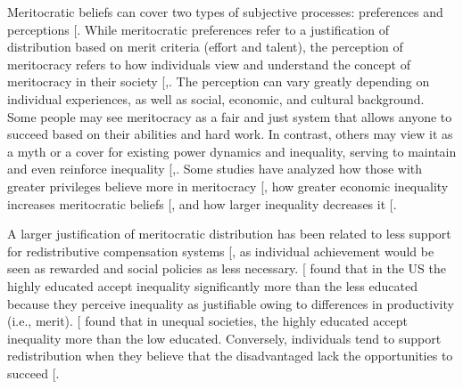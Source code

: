 \documentclass[
  12pt,
  letterpaper,
]{article}
\begin{document}
Meritocratic beliefs can cover two types of subjective processes:
preferences and perceptions
{[}\citeproc{ref-castillo_multidimensional_2023}{49}{]}. While
meritocratic preferences refer to a justification of distribution based
on merit criteria (effort and talent), the perception of meritocracy
refers to how individuals view and understand the concept of meritocracy
in their society
{[},\citeproc{ref-duru-bellat_who_2012}{52}{]}.
The perception can vary greatly depending on individual experiences, as
well as social, economic, and cultural background. Some people may see
meritocracy as a fair and just system that allows anyone to succeed
based on their abilities and hard work. In contrast, others may view it
as a myth or a cover for existing power dynamics and inequality, serving
to maintain and even reinforce inequality
{[},\citeproc{ref-lampert_meritocratic_2013}{53}{]}.
Some studies have analyzed how those with greater privileges believe
more in meritocracy {[}\citeproc{ref-reynolds_perceptions_2014}{13}{]},
how greater economic inequality increases meritocratic beliefs
{[}\citeproc{ref-mijs_paradox_2019}{51}{]}, and how larger inequality
decreases it {[}\citeproc{ref-morris_representing_2022}{54}{]}.

A larger justification of meritocratic distribution has been related to
less support for redistributive compensation systems
{[}\citeproc{ref-frank_performance_2015}{55}{]}, as individual
achievement would be seen as rewarded and social policies as less
necessary. {[}\citeproc{ref-almas_cutthroat_2020}{56}{]} found that in
the US the highly educated accept inequality significantly more than the
less educated because they perceive inequality as justifiable owing to
differences in productivity (i.e., merit).
{[}\citeproc{ref-barr_effect_2020}{57}{]} found that in unequal
societies, the highly educated accept inequality more than the low
educated. Conversely, individuals tend to support redistribution when
they believe that the disadvantaged lack the opportunities to succeed
{[}\citeproc{ref-evans_strong_2018}{58}{]}.
\end{document}
